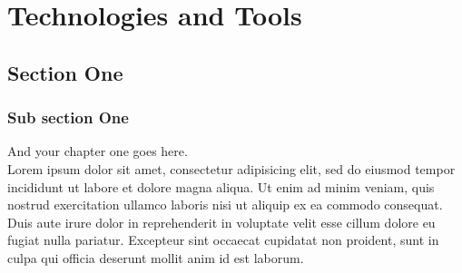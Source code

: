\chapter{Technologies and Tools}%
\label{chap:chap5}

\section{Section One}
\label{section:chap5:sec1}

  \subsection{Sub section One}
  And your chapter one goes here\cite{web001}\@. ~\\
  Lorem ipsum dolor sit amet, consectetur adipisicing elit, sed do eiusmod
  tempor incididunt ut labore et dolore magna aliqua. Ut enim ad minim veniam,
  quis nostrud exercitation ullamco laboris nisi ut aliquip ex ea commodo
  consequat. Duis aute irure dolor in reprehenderit in voluptate velit esse
  cillum dolore eu fugiat nulla pariatur. Excepteur sint occaecat cupidatat non
  proident, sunt in culpa qui officia deserunt mollit anim id est laborum.




